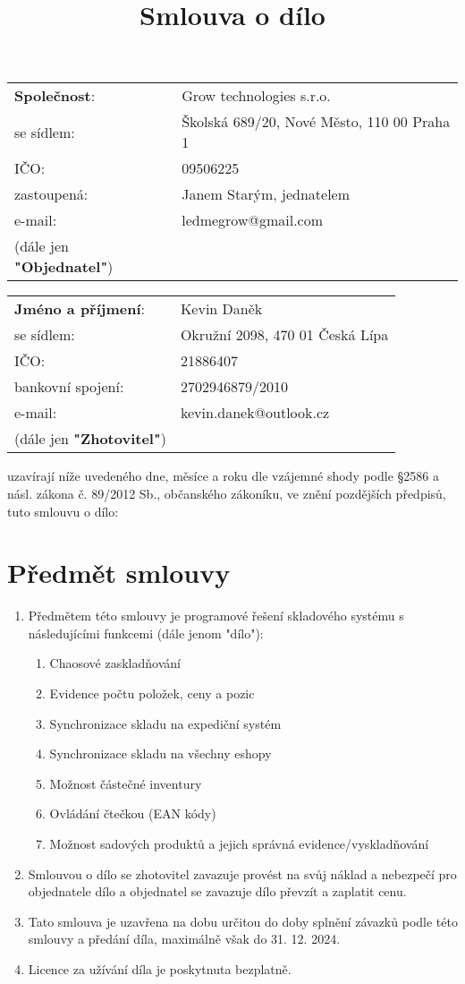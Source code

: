 \documentclass[]{article}
\title{
	{\textbf{Smlouva o dílo}}
}
\date{}
\makeatletter
\newcommand{\objednatel}{
	\begin{tabular}{@{}ll@{}}
		\textbf{Společnost}: & Grow technologies s.r.o.\\
		se sídlem: & Školská 689/20, Nové Město, 110 00 Praha 1\\
		IČO: & 09506225\\
		zastoupená: & Janem Starým, jednatelem\\
		e-mail: & ledmegrow@gmail.com \\
		(dále jen \textbf{"Objednatel"})\\
	\end{tabular}
}
\newcommand{\zhotovitel}{
	\begin{tabular}{@{}ll@{}}
		\textbf{Jméno a příjmení}: & Kevin Daněk\\
		se sídlem: & Okružní 2098, 470 01 Česká Lípa\\
		IČO: & 21886407\\
		bankovní spojení: & 2702946879/2010 \\
		e-mail: & kevin.danek@outlook.cz \\
		(dále jen \textbf{"Zhotovitel"})\\
	\end{tabular}
}
\makeatother
\begin{document}
\maketitle

\objednatel

\zhotovitel

uzavírají níže uvedeného dne, měsíce a roku dle vzájemné shody podle §2586 a násl. zákona č. 89/2012 Sb., občanského zákoníku, ve znění pozdějších předpisů, tuto smlouvu o dílo:

\section{Předmět smlouvy}

\begin{enumerate}
	\item Předmětem této smlouvy je programové řešení skladového systému s následujícími funkcemi (dále jenom "dílo"):
	\begin{enumerate}
		\item Chaosové zaskladňování
		\item Evidence počtu položek, ceny a pozic
		\item Synchronizace skladu na expediční systém
		\item Synchronizace skladu na všechny eshopy
		\item Možnost částečné inventury
		\item Ovládání čtečkou (EAN kódy)
		\item Možnost sadových produktů a jejich správná evidence/vyskladňování
	\end{enumerate}
	\item Smlouvou o dílo se zhotovitel zavazuje provést na svůj náklad a nebezpečí pro objednatele dílo a objednatel se zavazuje dílo převzít a zaplatit cenu.
	\item Tato smlouva je uzavřena na dobu určitou do doby splnění závazků podle této smlouvy a předání díla, maximálně však do 31. 12. 2024.
	\item Licence za užívání díla je poskytnuta bezplatně.
\end{enumerate}
\end{document}
